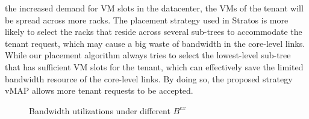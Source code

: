 \documentclass[review]{elsarticle}
\begin{document}
the increased demand for VM slots in the datacenter, the VMs of the tenant will be spread across more racks.
The placement strategy used in Stratos is more likely to select the racks that reside across several sub-trees to accommodate the tenant request, which may cause a big waste of bandwidth in the core-level links. While our placement algorithm always tries to select the lowest-level sub-tree that has sufficient VM slots for the tenant, which can effectively save the limited bandwidth resource of the core-level links. 
By doing so, the proposed strategy vMAP allows more tenant requests to be accepted. %

\begin{figure}[h]
	\centering
	\caption{Bandwidth utilizations under different $B^{ex}$}
	\label{fig:bw_util}
\end{figure}
\end{document}
